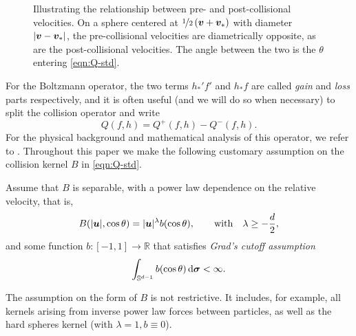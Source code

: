 \begin{figure}
    \centering
    \caption{Illustrating the relationship between pre- and post-collisional velocities. On a sphere centered
        at $\nicefrac{1}{2}\left({\bm v}+{\bm v}_\ast\right)$ with diameter $|{\bm v}-{\bm v}_\ast|$, the pre-collisional
        velocities are diametrically opposite, as are the post-collisional velocities. The angle between the
        two is the $\theta$ entering \eqref{eqn:Q-std}.}
    \label{fig:boltzmann-sphere}
\end{figure}

For the Boltzmann operator, the two terms $h_*'f'$ and $h_*f$ are called {\em gain} and {\em loss} parts
respectively, and it is often useful (and we will do so when necessary) to split the collision operator and
write
\[
    Q(f,h) = Q^{+}(f,h) - Q^{-}(f,h). 
\]
For the physical background and mathematical analysis of this operator, we refer to
\cite{Cercignani02,Villani02}. Throughout this paper we make the following customary assumption on the
collision kernel $B$ in \eqref{eqn:Q-std}.
\begin{assumption} \label{ass:B} Assume that $B$ is separable, with a power law dependence on the relative
    velocity, that is,
\begin{equation}\label{eq:CrossRep}
    B(|{\bm u}|,\cos\theta) = |{\bm u}|^\lambda b(\cos\theta),\qquad
        \text{with}\quad \lambda\geq-\frac{d}{2},
\end{equation}
and some function $b:[-1,1]\to\mathbb{R}$ that satisfies {\em Grad's cutoff assumption}
\begin{equation}\label{eq:Grad}
  \int_{\mathbb{S}^{d-1}}b(\cos\theta) \,\mathrm{d}{\bm\sigma} < \infty.
\end{equation}
\end{assumption}
The assumption on the form of $B$ is not restrictive. It includes, for example, all kernels arising from
inverse power law forces between particles, as well as the hard spheres kernel (with $\lambda=1,b\equiv0$).

